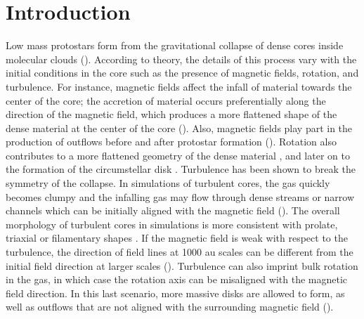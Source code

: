 \documentclass[iop]{emulateapj}
\begin{document}

\section{Introduction}
\label{sec_intro}

Low mass protostars form from the gravitational collapse of dense cores inside molecular clouds (\citealt{1989BensonSurvey,2002CaselliDense,1969LarsonNumerical,1987ShuStar}). According to theory, the details of this process vary with the initial conditions in the core such as the presence of magnetic fields, rotation, and turbulence. For instance, magnetic fields affect the infall of material towards the center of the core; the accretion of material occurs preferentially along the direction of the magnetic field, which produces a more flattened shape of the dense material at the center of the core (\citealt{1976MouschoviasNon,2014BateCollapse,2014LiLink}). Also, magnetic fields play part in the production of outflows before and after protostar formation (\citealt{2011MatsumotoProtostellar, 2013TomidaRadiation, 2014MachidaProtostellar, 2014BateCollapse,2015TomidaRadiation}).
Rotation also contributes to a more flattened geometry of the dense material \citep{2010BateCollapse}, and later on to the formation of the circumstellar disk \citep{2011MachidaOrigin}. Turbulence has been shown to break the symmetry of the collapse. In simulations of turbulent cores, the gas quickly becomes clumpy and the infalling gas may flow through dense streams or narrow channels which can be initially aligned with the magnetic field (\citealt{2011MatsumotoProtostellar,2011SmithQuantification,2012SmithLine,2015SeifriedAccretion}). The overall morphology of turbulent cores in simulations is more consistent with prolate, triaxial or filamentary shapes \citep{2008OffnerDriven,2011SmithQuantification}. If the magnetic field is weak with respect to the turbulence, the direction of field lines at 1000 au scales can be different from the initial field direction at larger scales (\citealt{2011MatsumotoProtostellar}). Turbulence can also imprint bulk rotation in the gas, in which case the rotation axis can be misaligned with the magnetic field direction. In this last scenario, more massive disks are allowed to form, as well as outflows that are not aligned with the surrounding magnetic field (\citealt{2000BurkertTurbulent,2010CiardiOutflows,2011MatsumotoProtostellar,2013JoosInfluence,2017LeeSynthetic}).
\end{document}
